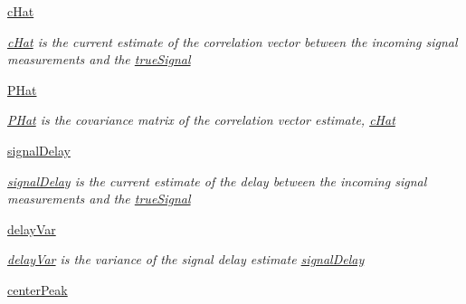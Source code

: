 \begin{DoxyCompactItemize}
\hyperlink{classSignalCorrelationSubstate_1_1CorrelationFilter_ad07b1d484b9ab77a1a8fc215f10faf15}{c\+Hat}
\begin{DoxyCompactList}\small\item\em \hyperlink{classSignalCorrelationSubstate_1_1CorrelationFilter_ad07b1d484b9ab77a1a8fc215f10faf15}{c\+Hat} is the current estimate of the correlation vector between the incoming signal measurements and the \hyperlink{classSignalCorrelationSubstate_1_1CorrelationFilter_a67ff75effd8a8a7e34f0f3e8c56ef491}{true\+Signal} \end{DoxyCompactList}\item 
\hyperlink{classSignalCorrelationSubstate_1_1CorrelationFilter_a9b079080abde4a661f95687e8ea89827}{P\+Hat}
\begin{DoxyCompactList}\small\item\em \hyperlink{classSignalCorrelationSubstate_1_1CorrelationFilter_a9b079080abde4a661f95687e8ea89827}{P\+Hat} is the covariance matrix of the correlation vector estimate, \hyperlink{classSignalCorrelationSubstate_1_1CorrelationFilter_ad07b1d484b9ab77a1a8fc215f10faf15}{c\+Hat} \end{DoxyCompactList}\item 
\hyperlink{classSignalCorrelationSubstate_1_1CorrelationFilter_a01e35890dee1d79bd0e4f9e82cb16e3f}{signal\+Delay}
\begin{DoxyCompactList}\small\item\em \hyperlink{classSignalCorrelationSubstate_1_1CorrelationFilter_a01e35890dee1d79bd0e4f9e82cb16e3f}{signal\+Delay} is the current estimate of the delay between the incoming signal measurements and the \hyperlink{classSignalCorrelationSubstate_1_1CorrelationFilter_a67ff75effd8a8a7e34f0f3e8c56ef491}{true\+Signal} \end{DoxyCompactList}\item 
\hyperlink{classSignalCorrelationSubstate_1_1CorrelationFilter_a34d52beb18c131f2305689d48f612a5a}{delay\+Var}
\begin{DoxyCompactList}\small\item\em \hyperlink{classSignalCorrelationSubstate_1_1CorrelationFilter_a34d52beb18c131f2305689d48f612a5a}{delay\+Var} is the variance of the signal delay estimate \hyperlink{classSignalCorrelationSubstate_1_1CorrelationFilter_a01e35890dee1d79bd0e4f9e82cb16e3f}{signal\+Delay} \end{DoxyCompactList}\item 
\hyperlink{classSignalCorrelationSubstate_1_1CorrelationFilter_a8e53182c2ff431a6a545a265cda6ba48}{center\+Peak}

\end{DoxyCompactItemize}
